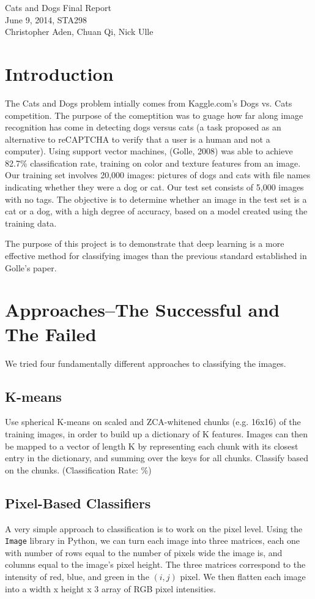 \documentclass[12pt]{article}
\begin{document}
\begin{center}
Cats and Dogs Final Report\\
June 9, 2014, STA298\\
Christopher Aden, Chuan Qi, Nick Ulle\\
\end{center}

\section{Introduction}
The Cats and Dogs problem intially comes from Kaggle.com's Dogs vs. Cats competition. The purpose of the comeptition was to guage how far along image recognition has come in detecting dogs versus cats (a task proposed as an alternative to reCAPTCHA to verify that a user is a human and not a computer). Using support vector machines, (Golle, 2008) was able to achieve 82.7\% classification rate, training on color and texture features from an image. Our training set involves 20,000 images: pictures of dogs and cats with file names indicating whether they were a dog or cat. Our test set consists of 5,000 images with no tags. The objective is to determine whether an image in the test set is a cat or a dog, with a high degree of accuracy, based on a model created using the training data.

The purpose of this project is to demonstrate that deep learning is a more effective method for classifying images than the previous standard established in Golle's paper. 

\section{Approaches--The Successful and The Failed}
We tried four fundamentally different approaches to classifying the images.


\subsection{K-means}
Use spherical K-means on scaled and ZCA-whitened chunks (e.g. 16x16) of the training images, in order to build up a dictionary of K features. Images can then be mapped to a vector of length K by representing each chunk with its closest entry in the dictionary, and summing over the keys for all chunks. Classify based on the chunks. (Classification Rate: \%)

\subsection{Pixel-Based Classifiers}
A very simple approach to classification is to work on the pixel level. Using the \verb+Image+ library in Python, we can turn each image into three matrices, each one with number of rows equal to the number of pixels wide the image is, and columns equal to the image's pixel height. The three matrices correspond to the intensity of red, blue, and green in the $(i,j)$ pixel. We then flatten each image into a width x height x 3 array of RGB pixel intensities. 
\end{document}
